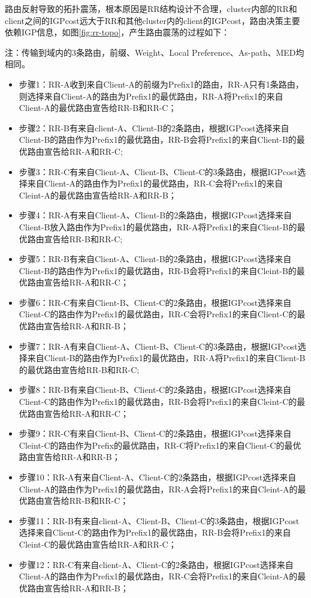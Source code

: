 路由反射导致的拓扑震荡，根本原因是RR结构设计不合理，cluster内部的RR和client之间的IGPcost远大于RR和其他cluster内的client的IGPcost，路由决策主要依赖IGP信息，如图\ref{fig:rr-topo}，产生路由震荡的过程如下：

注：传输到域内的3条路由，前缀、Weight、Local Preference、As-path、MED均相同。

\begin{itemize}
\item 步骤1：RR-A收到来自Client-A的前缀为Prefix1的路由，RR-A只有1条路由，则选择来自Client-A的路由为Prefix1的最优路由，RR-A将Prefix1的来自Client-A的最优路由宣告给RR-B和RR-C；
\item 步骤2：RR-B有来自client-A、Client-B的2条路由，根据IGPcost选择来自Client-B的路由作为Prefix1的最优路由，RR-B会将Prefix1的来自Client-B的最优路由宣告给RR-A和RR-C;
\item 步骤3：RR-C有来自Client-A、Client-B、Client-C的3条路由，根据IGPcost选择来自Client-A的路由作为Prefix1的最优路由，RR-C会将Prefix1的来自Cleint-A的最优路由宣告给RR-A和RR-B；


\item 步骤4：RR-A有来自Client-A、Client-B的2条路由，根据IGPcost选择来自Client-B放入路由作为Prefix1的最优路由，RR-A将Prefix1的来自Client-B的最优路由宣告给RR-B和RR-C;
\item 步骤5：RR-B有来自Client-A、Client-B的2条路由，根据IGPcost选择来自Client-B的路由作为Prefix1的最优路由，RR-B会将Prefix1的来自Cleint-B的最优路由宣告给RR-A和RR-C；
\item 步骤6：RR-C有来自Client-B、Client-C的2条路由，根据IGPcost选择来自Client-C的路由作为Prefix1的最优路由，RR-C会将Prefix1的来自Client-C的最优路由宣告给RR-A和RR-B；


\item 步骤7：RR-A有来自Client-A、Client-B、Client-C的3条路由，根据IGPcost选择来自Client-B的路由作为Prefix1的最优路由，RR-A将Prefix1的来自Client-B的最优路由宣告给RR-B和RR-C;
\item 步骤8：RR-B有来自Client-B、Client-C的2条路由，根据IGPcost选择来自Client-C的路由作为Prefix1的最优路由，RR-B会将Prefix1的来自Cleint-C的最优路由宣告给RR-A和RR-C；
\item 步骤9：RR-C有来自Client-B、Client-C的2条路由，根据IGPcost选择来自Cleint-C的路由作为Prefix的最优路由，RR-C将Prefix1的来自Client-C的最优路由宣告给RR-A和RR-B；


\item 步骤10：RR-A有来自Client-A、Client-C的2条路由，根据IGPcost选择来自Client-A的路由作为Prefix1的最优路由，RR-A会将Prefix1的来自Cleint-A的最优路由宣告给RR-B和RR-C；
\item 步骤11：RR-B有来自client-A、Client-B、Client-C的3条路由，根据IGPcost选择来自Client-C的路由作为Prefix1的最优路由，RR-B会将Prefix1的来自Cleint-C的最优路由宣告给RR-A和RR-C；
\item 步骤12：RR-C有来自client-A、Client-C的2条路由，根据IGPcost选择来自Client-A的路由作为Prefix1的最优路由，RR-C会将Prefix1的来自Cleint-A的最优路由宣告给RR-A和RR-B；



\end{itemize}
